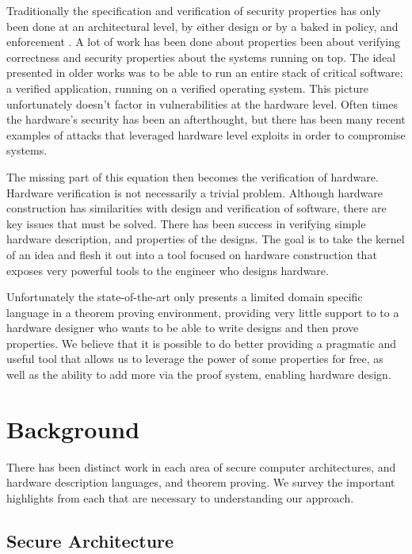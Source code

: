 \documentclass[12pt, titlepage]{article}
\begin{document}
Traditionally the specification and verification of security properties has only been done at an architectural 
level, by either design or by a baked in policy, and enforcement . A lot of work has been done about
properties been about verifying correctness and security properties about the systems running on top. The ideal presented 
in older works was to be able to run an entire stack of critical software; a verified application, running on a verified operating system. 
This picture unfortunately doesn't factor in vulnerabilities at the hardware level. Often times the hardware's security has been
an afterthought, but there has been many recent examples of attacks that leveraged hardware level exploits in order
to compromise systems. 

The missing part of this equation then becomes the verification of hardware. Hardware verification is not necessarily a trivial
problem. Although hardware construction has similarities with design and verification of software, there are 
key issues that must be solved. There has been success in verifying simple hardware description, 
and properties of the designs. The goal is to take the kernel of an idea and flesh it out into
a tool focused on hardware construction that exposes very powerful tools to the engineer who designs 
hardware.

Unfortunately the state-of-the-art \cite{fesi} only presents a limited domain specific language
in a theorem proving environment, providing very little support to to a hardware designer who wants to be 
able to write designs and then prove properties. We believe that it is possible to do better providing a 
pragmatic and useful tool that allows us to leverage the power of some properties for free, as well
as the ability to add more via the proof system, enabling hardware design. 

\section{Background}
There has been distinct work in each area of secure computer architectures, and 
hardware description languages, and theorem proving. We survey the important highlights from each
that are necessary to understanding our approach.

\subsection{Secure Architecture}
\end{document}
